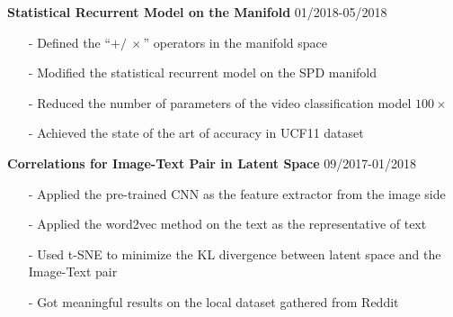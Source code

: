 \documentclass[margin]{res}
\begin{document}
\begin{resume}
                 \textbf{Statistical Recurrent Model on the Manifold} \hfill 01/2018-05/2018
                \begin{itemize}\itemsep -2.2pt %
                 \item[-] Defined the ``$+/\ \times$'' operators in the manifold space
                 \item[-] Modified the statistical recurrent model on the SPD manifold
                 \item[-] Reduced the number of parameters of the video classification model $100\times$
                 \item[-] Achieved the state of the art of accuracy in UCF11 dataset
                 \end{itemize}

                 \textbf{Correlations for Image-Text Pair in Latent Space} \hfill 09/2017-01/2018
                \begin{itemize}\itemsep -2.2pt %
                 \item[-] Applied the pre-trained CNN as the feature extractor from the image side 
                 \item[-] Applied the word2vec method on the text as the representative of text
                 \item[-] Used t-SNE to minimize the KL divergence between latent space and the Image-Text pair
                 \item[-] Got meaningful results on the local dataset gathered from Reddit
                 \end{itemize}



\end{resume}
\end{document}
